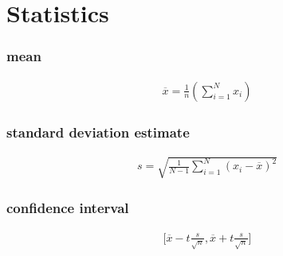 \section{Statistics}\label{ax:math:statistics}

\subsubsection{mean}

\begin{align*}
	\overline{x} = \frac{1}{n}{\left(\sum_{i=1}^{N}x_i\right)}
\end{align*}

\subsubsection{standard deviation estimate}

\begin{align*}
	s = \sqrt{\frac{1}{N-1}\sum_{i=1}^{N}{\left(x_i-\overline{x}\right)}^2}
\end{align*}

\subsubsection{confidence interval}

\begin{align*}
	\bigg[\overline{x}-t\frac{s}{\sqrt{n}}, \overline{x}+t\frac{s}{\sqrt{n}}\bigg]
\end{align*}

